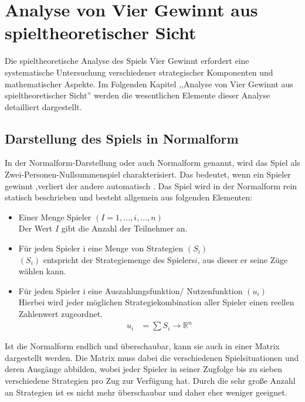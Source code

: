 \chapter{Analyse von Vier Gewinnt aus spieltheoretischer Sicht}


Die spieltheoretische Analyse des Spiels Vier Gewinnt erfordert eine systematische Untersuchung verschiedener strategischer Komponenten und mathematischer Aspekte. Im Folgenden Kapitel ,,Analyse von Vier Gewinnt aus spieltheoretischer Sicht'' werden die wesentlichen Elemente dieser Analyse detailliert dargestellt.
\section{Darstellung des Spiels in Normalform}



In der Normalform-Darstellung oder auch Normalform genannt, wird das Spiel als Zwei-Personen-Nullsummenspiel charakterisiert. Das bedeutet, wenn ein Spieler gewinnt ,verliert der andere automatisch . Das Spiel wird in der Normalform rein statisch beschrieben und besteht allgemein aus folgenden Elementen\autocite{gabler_normalform}:
\begin{itemize}
	\item Einer Menge Spieler $(I = {1, ..., i, ..., n})$ 
	\\ Der Wert $I$  gibt die Anzahl der Teilnehmer an.
	
	\item Für jeden Spieler i eine Menge von Strategien $(S_i)$
	\\$(S_i)$ entspricht der Strategiemenge des Spielers$i$, aus dieser er seine Züge wählen kann.
	\item Für jeden Spieler i eine Auszahlungsfunktion/ Nutzenfunktion $(u_i)$
	\\Hierbei wird jeder möglichen Strategiekombination aller Spieler einen reellen Zahlenwert zugeordnet. 
	\\  \begin{align}
		u_i &= \sum S_i \rightarrow \mathbb{R}^{n}  
\end{align}
\end{itemize}

Ist die Normalform endlich und überschaubar, kann sie auch in einer Matrix dargestellt werden.
Die Matrix muss dabei die verschiedenen Spielsituationen und deren Ausgänge abbilden, wobei jeder Spieler in seiner Zugfolge bis zu sieben verschiedene Strategien pro Zug zur Verfügung hat. Durch die sehr große Anzahl an Strategien ist es nicht mehr überschaubar und daher eher weniger geeignet.
